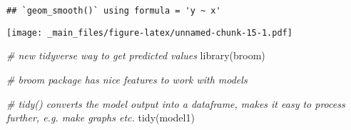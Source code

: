 \documentclass[
]{book}
\newenvironment{Shaded}{\begin{snugshade}}{\end{snugshade}}
\newcommand{\AttributeTok}[1]{\textcolor[rgb]{0.77,0.63,0.00}{#1}}
\newcommand{\AttributeTok}[1]{\textcolor[rgb]{0.13,0.29,0.53}{#1}}
\newcommand{\CommentTok}[1]{\textcolor[rgb]{0.56,0.35,0.01}{\textit{#1}}}
\newcommand{\FunctionTok}[1]{\textcolor[rgb]{0.00,0.00,0.00}{#1}}
\newcommand{\FunctionTok}[1]{\textcolor[rgb]{0.13,0.29,0.53}{\textbf{#1}}}
\newcommand{\NormalTok}[1]{#1}
\newcommand{\OtherTok}[1]{\textcolor[rgb]{0.56,0.35,0.01}{#1}}
\newcommand{\SpecialCharTok}[1]{\textcolor[rgb]{0.00,0.00,0.00}{#1}}
\newcommand{\SpecialCharTok}[1]{\textcolor[rgb]{0.81,0.36,0.00}{\textbf{#1}}}
\newcommand{\StringTok}[1]{\textcolor[rgb]{0.31,0.60,0.02}{#1}}
\begin{document}
\begin{Shaded}
\end{Shaded}

\begin{verbatim}
## `geom_smooth()` using formula = 'y ~ x'
\end{verbatim}

\texttt{[image: \_main\_files/figure-latex/unnamed-chunk-15-1.pdf]}

\begin{Shaded}
\begin{Highlighting}[]
\CommentTok{\# new tidyverse way to get predicted values}
\FunctionTok{library}\NormalTok{(broom)}

\CommentTok{\# broom package has nice features to work with models}

\CommentTok{\# tidy() converts the model output into a dataframe, makes it easy to process further, e.g. make graphs etc.}
\FunctionTok{tidy}\NormalTok{(model1)}
\end{Highlighting}
\end{Shaded}
\end{document}
